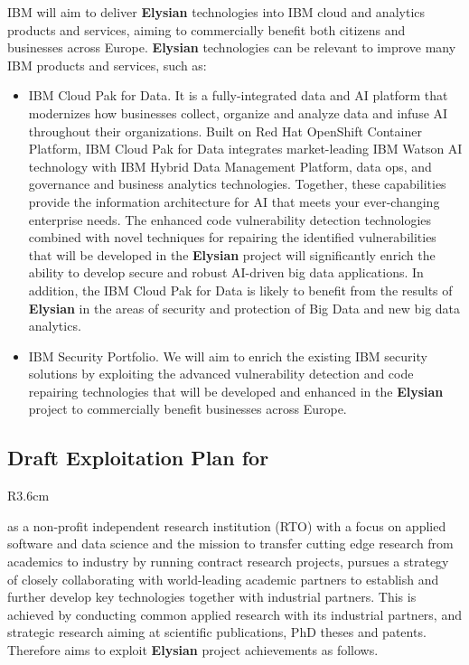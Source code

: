 \documentclass[a4paper,11pt]{article}
\newcommand{\project}[1]{\textbf{#1}\xspace}
\newcommand{\SECURITY}{\project{Elysian}}
\newcommand{\TheProject}{\SECURITY}
\begin{document}
IBM will aim to deliver \TheProject technologies into IBM cloud and analytics products and services, aiming to commercially benefit both citizens and businesses across Europe. \TheProject technologies can be relevant to improve many IBM products and services, such as:
\begin{itemize}
    \item IBM Cloud Pak for Data. It is a fully-integrated data and AI platform that modernizes how businesses collect, organize and analyze data and infuse AI throughout their organizations. Built on Red Hat OpenShift Container Platform, IBM Cloud Pak for Data integrates market-leading IBM Watson AI technology with IBM Hybrid Data Management Platform, data ops, and governance and business analytics technologies. Together, these capabilities provide the information architecture for AI that meets your ever-changing enterprise needs. The enhanced code vulnerability detection technologies combined with novel techniques for repairing the identified vulnerabilities that will be developed in the \TheProject project will significantly enrich the ability to develop secure and robust AI-driven big data applications. In addition, the IBM Cloud Pak for Data is likely to benefit from the results of \TheProject in the areas of security and protection of Big Data and new big data analytics.
    \item IBM Security Portfolio. We will aim to enrich the existing IBM security solutions by exploiting the advanced vulnerability detection and code repairing technologies that will be developed and enhanced in the \TheProject project to commercially benefit businesses across Europe.
\end{itemize}

\horizontalline

\subsection*{Draft Exploitation Plan for \SCCHshort{}}
\vspace{-6pt}

\begin{wrapfigure}{R}{3.6cm}
\vspace{-1.3cm}
\hfill {}
\vspace{-0.8cm}
\end{wrapfigure}


\SCCHlong{} as a non-profit independent research institution (RTO) with a focus on applied software and data science and the mission to transfer cutting edge research from academics to industry by running contract research projects, pursues a strategy of closely collaborating with world-leading academic partners to establish and further develop key technologies together with industrial partners. This is achieved by conducting common applied research with its industrial partners, and strategic research aiming at scientific publications, PhD theses and patents. Therefore \SCCHshort{} aims to exploit  \TheProject{} project achievements as follows.
\end{document}

